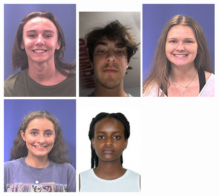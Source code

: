 \documentclass[xcolor={usenames,dvipsnames,svgnames,table},12pt]{beamer}
\begin{document}
\begin{frame}{}
\begin{center}
\includegraphics[width=\photosize]{S21/000568759.jpg}
\includegraphics[width=\photosize]{S21/000572733.jpg}
\includegraphics[width=\photosize]{S21/000565383.jpg}
\includegraphics[width=\photosize]{S21/000565535.jpg}
\includegraphics[width=\photosize]{S21/000573698.jpg}

\end{center}
\end{frame}
\end{document}
